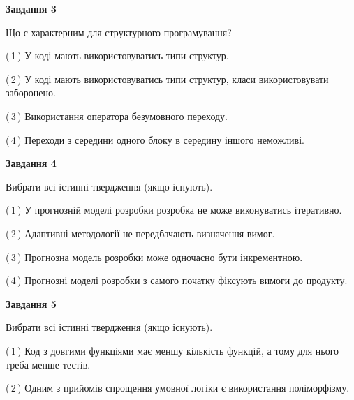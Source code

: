 \documentclass[10pt, ukrainian]{article}
\begin{document}
{\begin {large}
{\begin {center}\textbf{Завдання 3}\end {center}}\par
Що є характерним для структурного програмування?\par
\vspace{2mm}



(\,1\,) У коді мають використовуватись типи структур. %



(\,2\,) У коді мають використовуватись типи структур, класи використовувати заборонено. %



(\,3\,) Використання оператора безумовного переходу. %



(\,4\,) Переходи з середини одного блоку в середину іншого неможливі. %


{\begin {center}\textbf{Завдання 4}\end {center}}\par
Вибрати всі істинні твердження (якщо існують).\par
\vspace{2mm}



(\,1\,) У прогнозній моделі розробки розробка не може виконуватись ітеративно. %



(\,2\,) Адаптивні методології не передбачають визначення вимог. %



(\,3\,) Прогнозна модель розробки може одночасно бути інкрементною. %



(\,4\,) Прогнозні моделі розробки з самого початку фіксують вимоги до продукту. %


{\begin {center}\textbf{Завдання 5}\end {center}}\par
Вибрати всі істинні твердження (якщо існують).\par
\vspace{2mm}



(\,1\,) Код з довгими функціями має меншу кількість функцій, а тому для нього треба менше тестів. %



(\,2\,) Одним з прийомів спрощення умовної логіки є використання поліморфізму. %




\end{large}}
\end{document}
